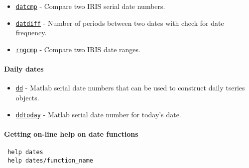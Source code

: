  \begin{itemize}
 \item
   \href{dates/datcmp}{\texttt{datcmp}} - Compare two IRIS serial date
   numbers.
 \item
   \href{dates/datdiff}{\texttt{datdiff}} - Number of periods between two
   dates with check for date frequency.
 \item
   \href{dates/rngcmp}{\texttt{rngcmp}} - Compare two IRIS date ranges.
 \end{itemize}
 
 \paragraph{Daily dates}
 
 \begin{itemize}
 \item
   \href{dates/dd}{\texttt{dd}} - Matlab serial date numbers that can be
   used to construct daily tseries objects.
 \item
   \href{dates/ddtoday}{\texttt{ddtoday}} - Matlab serial date number for
   today's date.
 \end{itemize}
 
 \paragraph{Getting on-line help on date functions}
 
 \begin{verbatim}
 help dates
 help dates/function_name
 \end{verbatim}



